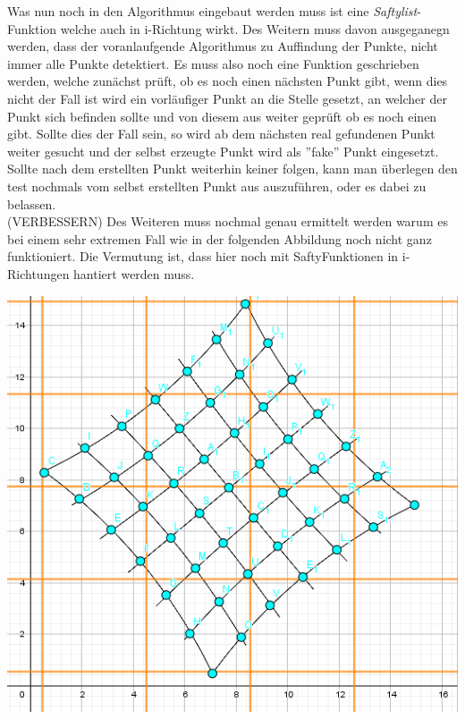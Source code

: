 Was nun noch in den Algorithmus eingebaut werden muss ist eine \textit{Saftylist}-Funktion welche auch in i-Richtung wirkt. Des Weitern muss davon ausgeganegn werden, dass der voranlaufgende Algorithmus zu Auffindung der Punkte, nicht immer alle Punkte detektiert. Es muss also noch eine Funktion geschrieben werden, welche zunächst prüft, ob es noch einen nächsten Punkt gibt, wenn dies nicht der Fall ist wird ein vorläufiger Punkt an die Stelle gesetzt, an welcher der Punkt sich befinden sollte und von diesem aus weiter geprüft ob es noch einen gibt. Sollte dies der Fall sein, so wird ab dem nächsten real gefundenen Punkt weiter gesucht und der selbst erzeugte Punkt wird als ''fake'' Punkt eingesetzt. Sollte nach dem erstellten Punkt weiterhin keiner folgen, kann man überlegen den test nochmals vom selbst erstellten Punkt aus auszuführen, oder es dabei zu belassen. \\

(VERBESSERN)
Des Weiteren muss nochmal genau ermittelt werden warum es bei einem sehr extremen Fall wie in der folgenden Abbildung noch nicht ganz funktioniert. Die Vermutung ist, dass hier noch mit SaftyFunktionen in i-Richtungen hantiert werden muss. 

\begin{minipage}{\linewidth}
	\centering
	\includegraphics[width=.8\linewidth]{images/extrBsp.png}
\end{minipage}\\

